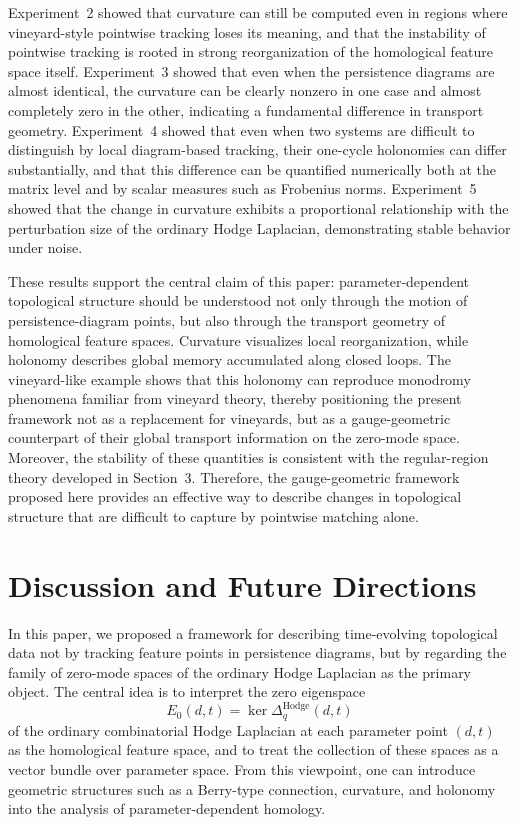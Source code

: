 \documentclass[pdflatex,sn-mathphys-num]{sn-jnl}%
\theoremstyle{thmstyleone}%
\theoremstyle{thmstyletwo}%
\theoremstyle{thmstylethree}%
\begin{document}
Experiment~2 showed that curvature can still be computed even in regions where vineyard-style pointwise tracking loses its meaning, and that the instability of pointwise tracking is rooted in strong reorganization of the homological feature space itself. Experiment~3 showed that even when the persistence diagrams are almost identical, the curvature can be clearly nonzero in one case and almost completely zero in the other, indicating a fundamental difference in transport geometry. Experiment~4 showed that even when two systems are difficult to distinguish by local diagram-based tracking, their one-cycle holonomies can differ substantially, and that this difference can be quantified numerically both at the matrix level and by scalar measures such as Frobenius norms. Experiment~5 showed that the change in curvature exhibits a proportional relationship with the perturbation size of the ordinary Hodge Laplacian, demonstrating stable behavior under noise.

These results support the central claim of this paper: parameter-dependent topological structure should be understood not only through the motion of persistence-diagram points, but also through the transport geometry of homological feature spaces. Curvature visualizes local reorganization, while holonomy describes global memory accumulated along closed loops. The vineyard-like example shows that this holonomy can reproduce monodromy phenomena familiar from vineyard theory, thereby positioning the present framework not as a replacement for vineyards, but as a gauge-geometric counterpart of their global transport information on the zero-mode space. Moreover, the stability of these quantities is consistent with the regular-region theory developed in Section~3. Therefore, the gauge-geometric framework proposed here provides an effective way to describe changes in topological structure that are difficult to capture by pointwise matching alone.







\section{Discussion and Future Directions}

In this paper, we proposed a framework for describing time-evolving topological data not by tracking feature points in persistence diagrams, but by regarding the family of zero-mode spaces of the ordinary Hodge Laplacian as the primary object. The central idea is to interpret the zero eigenspace
\[
E_0(d,t)=\ker \Delta^{\mathrm{Hodge}}_{q}(d,t)
\]
of the ordinary combinatorial Hodge Laplacian at each parameter point \((d,t)\) as the homological feature space, and to treat the collection of these spaces as a vector bundle over parameter space. From this viewpoint, one can introduce geometric structures such as a Berry-type connection, curvature, and holonomy into the analysis of parameter-dependent homology.
\end{document}

